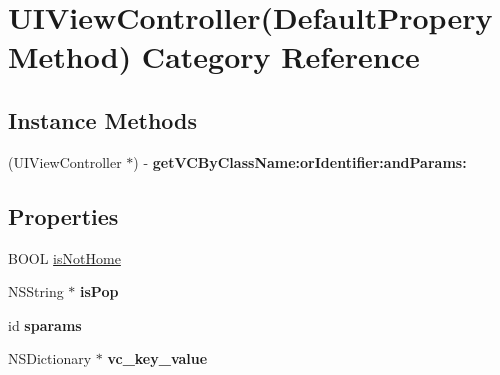 \hypertarget{category_u_i_view_controller_07_default_propery_method_08}{}\section{U\+I\+View\+Controller(Default\+Propery\+Method) Category Reference}
\label{category_u_i_view_controller_07_default_propery_method_08}
\subsection*{Instance Methods}
\begin{DoxyCompactItemize}
\item 
\mbox{\label{category_u_i_view_controller_07_default_propery_method_08_a5963f30b8096136524a2860380e7cd45}} 
(U\+I\+View\+Controller $\ast$) -\/ {\bfseries get\+V\+C\+By\+Class\+Name\+:or\+Identifier\+:and\+Params\+:}
\end{DoxyCompactItemize}
\subsection*{Properties}
\begin{DoxyCompactItemize}
\item 
B\+O\+OL \mbox{\hyperlink{category_u_i_view_controller_07_default_propery_method_08_a556b4f407ac257deeaee4f3a45952b84}{is\+Not\+Home}}
\item 
\mbox{\label{category_u_i_view_controller_07_default_propery_method_08_aeac20bff2f01bcf1d65e16fb1f92e6f9}} 
N\+S\+String $\ast$ {\bfseries is\+Pop}
\item 
\mbox{\label{category_u_i_view_controller_07_default_propery_method_08_a1abf639938e987db52ecd83115bab2a8}} 
id {\bfseries sparams}
\item 
\mbox{\label{category_u_i_view_controller_07_default_propery_method_08_a2a7d026b1bb3499305a123ef24206501}} 
N\+S\+Dictionary $\ast$ {\bfseries vc\+\_\+key\+\_\+value}
\end{DoxyCompactItemize}


